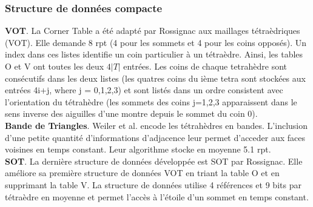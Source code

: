 \documentclass[a4paper,11pt,openany]{article}
\begin{document}
\subsubsection{Structure de données compacte}
\noindent
\textbf{VOT}. La Corner Table a été adapté par Rossignac aux maillages tétraèdriques (VOT). Elle demande 8 rpt (4 pour les sommets et 4 pour les coins opposés). Un index dans ces listes identifie un coin particulier à un tétraèdre. Ainsi, les tables O et V ont toutes les deux $4|T|$ entrées. Les coins de chaque tetrahèdre sont consécutifs dans les deux listes (les quatres coins du ième tetra sont stockées aux entrées  4i+j, where j = 0,1,2,3) et sont listés dans un ordre consistent avec l'orientation du tétrahèdre (les sommets des coins j=1,2,3 apparaissent dans le sens inverse des aiguilles d'une montre depuis le sommet du coin 0).\\
\textbf{Bande de Triangles}. Weiler et al. \cite{triangle_strips_weiler} encode les tétrahèdres en bandes. L'inclusion d'une petite quantité d'informations d'adjacence leur permet d'acceder aux faces voisines en temps constant. Leur algorithme stocke en moyenne 5.1 rpt.\\
\textbf{SOT}. La dernière structure de données développée est SOT \cite{SOT} par Rossignac. Elle améliore sa première structure de données VOT en triant la table O et en supprimant la table V. La structure de données utilise 4 références et 9 bits par tétraèdre en moyenne et permet l'accès à l'étoile d'un sommet en temps constant.

\end{document}
